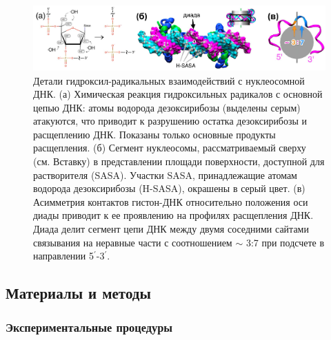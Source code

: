 \begin{figure}[H]
    \centering
    \includegraphics[width=\textwidth]{images/p5/part5_2_nar/p5_2_f2.pdf}
    \caption[Детали гидроксил-радикальных взаимодействий с нуклеосомной ДНК.]{Детали гидроксил-радикальных взаимодействий с нуклеосомной ДНК. (а) Химическая реакция гидроксильных радикалов с основной цепью ДНК: атомы водорода дезоксирибозы (выделены серым) атакуются, что приводит к разрушению остатка дезоксирибозы и расщеплению ДНК. Показаны только основные продукты расщепления. (б) Сегмент нуклеосомы, рассматриваемый сверху (см. Вставку) в представлении площади поверхности, доступной для растворителя (SASA). Участки SASA, принадлежащие атомам водорода дезоксирибозы (H-SASA), окрашены в серый цвет. (в) Асимметрия контактов гистон-ДНК относительно положения оси диады приводит к ее проявлению на профилях расщепления ДНК. Диада делит сегмент цепи ДНК между двумя соседними сайтами связывания на неравные части с соотношением $\sim$ 3:7 при подсчете в направлении 5$^\prime$-3$^\prime$. }
    \label{fig:p5:p5_2_f2}
\end{figure}

\subsection{Материалы и методы}
\subsubsection{Экспериментальные процедуры}

